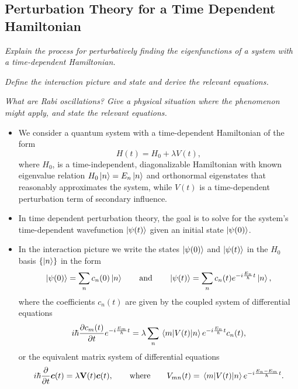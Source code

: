 \documentclass[11pt, a4paper]{article}
\newcommand{\Ham}{Hamiltonian\xspace}
\renewcommand{\vec}[1]{\bm{#1}}  %
\newcommand{\mat}[1]{\mathbf{#1}}  %
\newcommand{\p}{\psi}  %
\begin{document}
\subsection{Perturbation Theory for a Time Dependent \Ham}
\textit{Explain the process for perturbatively finding the eigenfunctions of a system with a time-dependent \Ham.}

\vspace{2mm}
\textit{Define the interaction picture and state and derive the relevant equations.}

\vspace{2mm}
\textit{What are Rabi oscillations? Give a physical situation where the phenomenon might apply, and state the relevant equations.}

\begin{itemize}
    \item We consider a quantum system with a time-dependent \Ham of the form
    \begin{equation*}
        H(t) = H_{0} + \lambda V(t),
    \end{equation*}
    where $ H_{0} $, is a time-independent, diagonalizable \Ham with known eigenvalue relation $ H_{0}\ket{n} = E_{n}\ket{n} $ and orthonormal eigenstates that reasonably approximates the system, while $ V(t) $ is a time-dependent perturbation term of secondary influence.

    \item In time dependent perturbation theory, the goal is to solve for the system's time-dependent wavefunction $ \ket{\psi(t)} $ given an initial state $ \ket{\psi(0)} $. 

    \item In the interaction picture we write the states $ \ket{\psi(0)} $ and $ \ket{\psi(t)} $ in the  $ H_{0} $ basis $ \{\ket{n}\} $ in the form
    \begin{equation*}
        \ket{\p(0)} = \sum_{n}c_{n}(0)\ket{n} \qquad \text{and} \qquad \ket{\psi(t)} = \sum_{n}c_{n}(t)e^{-i \frac{E_{n}}{\hbar}t}\ket{n},
    \end{equation*}
    where the coefficients $ c_{n}(t) $ are given by the coupled system of differential equations
    \begin{equation*}
        i \hbar \pdv{c_{m}(t)}{t}e^{-i \frac{E_{m}}{\hbar}t} = \lambda \sum_{n} \mel{m}{V(t)}{n}e^{-i \frac{E_{n}}{\hbar}t} c_{n}(t),
    \end{equation*}
    or the equivalent matrix system of differential equations
    \begin{equation*}
        i \hbar \pdv{t} \vec{c}(t) = \lambda \mat{V}(t) \vec{c}(t), \qquad \text{where} \qquad V_{mn}(t) = \mel{m}{V(t)}{n} e^{-i \frac{E_{n} - E_{m}}{\hbar}t}.
    \end{equation*}


\end{itemize}
\end{document}
